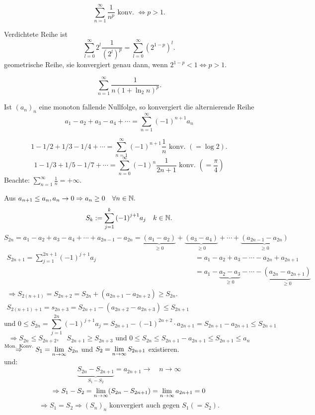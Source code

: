 \documentclass[../ana1.tex]{subfiles}
\begin{document}
\begin{bsp}
	\[ \sum_{n=1}^{\infty} \frac{1}{n^p} \text{ konv. } \Leftrightarrow p>1. \]
\end{bsp}
\begin{bew}
	Verdichtete Reihe ist 
	\[ \sum_{l=0}^{\infty}2^l \frac{1}{{(2^l)}^p} = \sum_{l=0}^{\infty} {(2^{1-p})}^l. \]
	geometrische Reihe, sie konvergiert genau dann, wenn \( 2^{1-p} < 1 \Leftrightarrow p>1. \)
\end{bew}
\begin{bsp}
	\[ \sum_{n=1}^{\infty} \frac{1}{n{(1+\ln_2 n )}^p}.\]
\end{bsp}
\begin{satz}[Leibniz]
	Ist \( {(a_n)}_n \) eine monoton fallende Nullfolge, so konvergiert die alternierende Reihe
	\[ a_1 - a_2 + a_3 - a_4 + \cdots = \sum_{n=1}^{\infty} {(-1)}^{n+1} a_n \]
\end{satz}
\begin{bsp}
	\[ 1 - 1/2 + 1/3 - 1/4 + \cdots = \sum_{n=1}^{\infty}{(-1)}^{n+1}\frac{1}{n} \text{ konv. } (=\log 2). \]
	\[ 1 - 1/3 + 1/5 - 1/7 + \cdots = \sum_{n=0}^{\infty}{(-1)}^n \frac{1}{2n+1} \text{ konv. } (=\frac{\pi}{4}) \]
	Beachte: \( \sum_{n=1}^{\infty}\frac{1}{n} = +\infty \).
\end{bsp}
\begin{bew}
	Aus \( a_{n+1} \leq a_n, a_n \rightarrow 0 \Rightarrow a_n \geq 0 \quad\forall n\in\mathbb{N}. \)
	\[ S_k := \sum_{j=1}^{k} {(-1)}^{j+1} a_j \quad k\in\mathbb{N}. \]
	\[S_{2n} = a_1 - a_2 + a_3 - a_4 + \cdots + a_{2n-1} - a_{2n} = \underbrace{(a_1 - a_2)}_{\geq 0} + \underbrace{(a_3 - a_4)}_{\geq 0} + \cdots + \underbrace{(a_{2n-1} - a_{2n})}_{\geq 0} \]
	\begin{align*}
		S_{2n+1} = \sum_{j=1}^{2n+1}{(-1)}^{j+1}a_j &= a_1 - a_2 + a_3 - \cdots - a_{2n} + a_{2n+1}\\
		&= a_1 - \underbrace{a_2 - a_3}_{\geq 0} - \cdots - \underbrace{(a_{2n} - a_{2n+1})}_{\geq 0}\\
		\Rightarrow S_{2(n+1)} = S_{2n+2} = S_{2n} + (a_{2n+1} - a_{2n+2}) \geq S_{2n}.\\
		S_{2(n+1)+1} = s_{2n+3} = S_{2n+1} - (a_{2n+2} - a_{2n+3}) \leq S_{2n+1}
	\end{align*}
	\[ \text{und } 0 \leq S_{2n} = \sum_{j=1}^{2n} {(-1)}^{j+1} a_j = S_{2n+1} - {(-1)}^{2n+2} \cdot a_{2n+1} = S_{2n+1} - a_{2n+1} \leq S_{2n+1}\]
	\[\Rightarrow S_{2n} \leq S_{2n+2}, \quad S_{2n+1} \geq S_{2n+3} \text{ und } 0 \leq S_{2n} \leq S_{2n+1} - a_{2n+1} \leq S_{2n+1} \leq a_n\]
	\( \overset{\text{Mon. Konv.}}{\Rightarrow} S_1 = \lim\limits_{n\rightarrow\infty}S_{2n} \) und \( S_2 = \lim\limits_{n\rightarrow\infty}S_{2n+1} \) existieren.\\	
	und: 
	\[ \underbrace{S_{2n} - S_{2n+1}}_{S_1 - S_2} = a_{2n+1} \rightarrow \quad n\rightarrow \infty \]
	\[ \Rightarrow S_1 - S_2 = \lim\limits_{n\rightarrow\infty}(S_{2n} - S_{2n+1}) = \lim\limits_{n\rightarrow\infty}a_{2n+1} = 0 \]
	\[ \Rightarrow S_1 = S_2 \Rightarrow {(S_n)}_n \text{ konvergiert auch gegen } S_1 (=S_2). \]
\end{bew}
\end{document}
